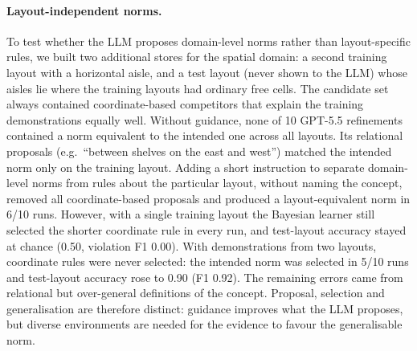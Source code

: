 \paragraph{Layout-independent norms.} To test whether the LLM proposes domain-level norms rather than layout-specific
rules, we built two additional stores for the spatial domain: a second training layout with a horizontal aisle, and
a test layout (never shown to the LLM) whose aisles lie where the training layouts had ordinary free cells. The
candidate set always contained coordinate-based competitors that explain the training demonstrations equally well.
Without guidance, none of 10 GPT-5.5 refinements contained a norm equivalent to the intended one across all
layouts. Its relational proposals (e.g.\ ``between shelves on the east and west'') matched the intended norm only on
the training layout. Adding a short instruction to separate domain-level norms from rules about the particular
layout, without naming the concept, removed all coordinate-based proposals and produced a layout-equivalent norm in
6/10 runs. However, with a single training layout the Bayesian learner still selected the shorter coordinate rule in
every run, and test-layout accuracy stayed at chance (0.50, violation F1 0.00). With demonstrations from two
layouts, coordinate rules were never selected: the intended norm was selected in 5/10 runs and test-layout accuracy
rose to 0.90 (F1 0.92). The remaining errors came from relational but over-general definitions of the concept.
Proposal, selection and generalisation are therefore distinct: guidance improves what the LLM proposes, but
diverse environments are needed for the evidence to favour the generalisable norm.
